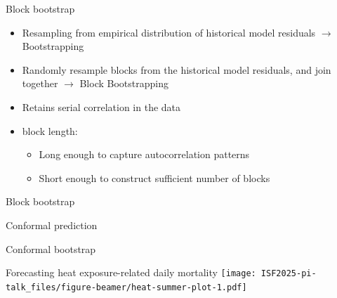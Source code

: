 \documentclass[
  12pt,
  ignorenonframetext,
  aspectratio=169,
]{beamer}
\begin{document}
\begin{frame}{Block bootstrap}
\label{block-bootstrap}
\begin{itemize}
  \item Resampling from empirical distribution of historical model residuals \color{violet} ${\rightarrow}$ Bootstrapping \newline
  \pause
  \item \color{black} Randomly resample blocks from the historical model residuals, and join together \alert{${\rightarrow}$ Block Bootstrapping} 
  \item Retains serial correlation in the data 
  \pause
  \item \color{violet} block length:
  \begin{itemize}
    \item Long enough to capture autocorrelation patterns
    \item Short enough to construct sufficient number of blocks
  \end{itemize}
\end{itemize}
\end{frame}

\begin{frame}{Block bootstrap}
\label{block-bootstrap-1}
\end{frame}

\begin{frame}{Conformal prediction}
\label{conformal-prediction}
\end{frame}

\begin{frame}{Conformal bootstrap}
\label{conformal-bootstrap}
\end{frame}

\begin{frame}{Forecasting heat exposure-related daily mortality}
\label{forecasting-heat-exposure-related-daily-mortality}
\texttt{[image: ISF2025-pi-talk\_files/figure-beamer/heat-summer-plot-1.pdf]}
\end{frame}
\end{document}

